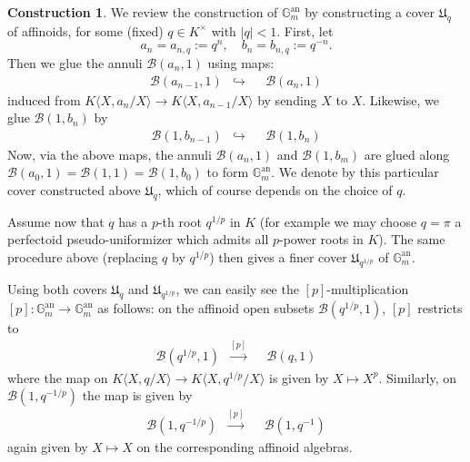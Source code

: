 \documentclass[10pt,oneside]{amsart}
\theoremstyle{definition}
\newtheorem{construction}[theorem]{Construction}
\begin{document}
\begin{construction} \label{construction:gluing_rigid}	We review the construction of   $\mathbb G_m^{\operatorname{an}}$ by constructing a cover $\mathfrak U_q$ of affinoids, for some (fixed) $q \in K^\times$ with $|q| < 1$.  First, let 
$$a_n = a_{n, q} := q^n, \quad  b_n = b_{n, q} := q^{-n}.$$
 Then we glue the annuli $\mathcal B(a_n,1)$ using maps:
	\begin{equation}\label{torus explicit cover glue map 1}
	\begin{alignedat}{2}
	\mathcal B(a_{n-1},1)&\hookrightarrow&& \mathcal B(a_{n},1)
	\end{alignedat}
	\end{equation}
induced from 
$ K\langle X,a_n/X\rangle \rightarrow K\langle X,a_{n-1}/X\rangle $ by sending $X$ to $X$.  Likewise, we glue $\mathcal B(1,b_n)$
by
	\begin{equation}\label{torus explicit cover glue map 2}
	\begin{alignedat}{2}
	\mathcal B(1,b_{n-1})&\hookrightarrow&& \mathcal B(1,b_{n}) 
	\end{alignedat}
	\end{equation}
Now, via the above maps, the annuli $\mathcal B(a_n,1)$ and $\mathcal B(1,b_m)$ are glued along $\mathcal B(a_0,1)=\mathcal B(1,1)=\mathcal B(1,b_0)$  to form $\mathbb{G}_m^{\operatorname{an}}$. We denote by this particular cover constructed above $\mathfrak U_q$, which of course depends on the choice of $q$. 
\end{construction}	
	
	
	Assume now that $q$ has a $p$-th root $q^{1/p}$ in $K$ (for example we may choose $q = \pi$ a perfectoid pseudo-uniformizer which admits all $p$-power roots in $K$). The same procedure above (replacing $q$ by $q^{1/p}$) then gives a finer cover $\mathfrak U_{q^{1/p}}$ of $\mathbb G_m^{\operatorname{an}}$.
	
	 Using both covers $\mathfrak U_q$ and $\mathfrak U_{q^{1/p}}$, we can easily see the $[p]$-multiplication $[p]:\mathbb G_m^{\operatorname{an}}\rightarrow \mathbb G_m^{\operatorname{an}}$ as follows: on the affinoid open subsets $\mathcal B(q^{1/p},1)$, $[p]$ restricts to
	\begin{equation}
	\begin{alignedat}{2} \label{torus explicit [p] map 1}
	\mathcal B(q^{1/p},1)&\xrightarrow{[p]}&& \mathcal B(q,1) 
	\end{alignedat} 
	\end{equation}
where the map on $K\langle X,q/X\rangle \rightarrow K\langle X,q^{1/p}/X\rangle $ is given by $X \mapsto X^p$. Similarly, on $\mathcal B(1,q^{-1/p})$ the map is given by
	\begin{equation}
	\begin{alignedat}{2} \label{torus explicit [p] map 2}
	\mathcal B(1,q^{-1/p})&\xrightarrow{[p]}&& \mathcal B(1,q^{-1}) 
	\end{alignedat}
	\end{equation}
again given by $X \mapsto X$ on the corresponding affinoid algebras. 
		
\end{document}
